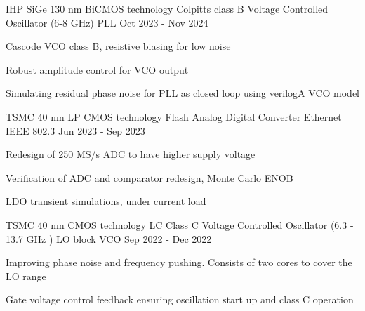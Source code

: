 


\begin{cventries}


\cventry
{IHP SiGe 130 nm BiCMOS technology} %
{Colpitts class B Voltage Controlled Oscillator (6-8 GHz) } %
{PLL} %
{Oct 2023 - Nov 2024} %
{ %
\begin{cvitems}
    \item {Cascode VCO class B, resistive biasing for low noise}
    \item {Robust amplitude control for VCO output}
    \item {Simulating residual phase noise for PLL as closed loop using verilogA VCO model}
\end{cvitems}
}


\cventry
{TSMC 40 nm LP CMOS technology} %
{Flash Analog Digital Converter} %
{Ethernet IEEE 802.3} %
{Jun 2023 - Sep 2023} %
{ %
\begin{cvitems}
    \item {Redesign of 250 MS/s ADC to have higher supply voltage}
    \item {Verification of ADC and comparator redesign, Monte Carlo ENOB}
    \item {LDO transient simulations, under current load}
\end{cvitems}
}


\cventry
{TSMC 40 nm CMOS technology} %
{LC Class C Voltage Controlled Oscillator (6.3 - 13.7 GHz )} %
{LO block VCO} %
{Sep 2022 - Dec 2022} %
{ %
\begin{cvitems}
    \item {Improving phase noise and frequency pushing. Consists of two cores to cover the LO range}
    \item {Gate voltage control feedback ensuring oscillation start up and class C operation}
\end{cvitems}
}


\end{cventries}
